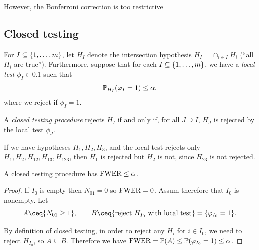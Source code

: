 However, the Bonferroni correction is too restrictive

\subsection{Closed testing}
For $I \subseteq \qty{1, \dotsc, m}$, let $H_I$ denote the intersection hypothesis $H_I = \cap_{i \in I} H_i$ (``all $H_i$ are true'').  Furthermore, suppose that for each $I \subseteq \qty{1, \dotsc, m}$, we have a \emph{local test} $\phi_I \in \qty{0, 1}$ such that
\[
\mathbb P_{H_I}(\varphi_I = 1) \leq \alpha,
\]
where we reject if $\phi_I= 1$.

\begin{definition}
	A \emph{closed testing procedure} rejects $H_I$ if and only if, for all $J \supseteq I$, $H_J$ is rejected by the local test $\phi_J$. 
\end{definition} 

\begin{example}
	If we have hypotheses $H_1, H_2, H_3$, and the local test rejects only $H_1, H_2, H_{12}, H_{13}, H_{123}$, then $H_1$ is rejected but $H_2$ is not, since $H_{23}$ is not rejected. 
\end{example}

\begin{theorem}
	A closed testing procedure has $\operatorname{FWER} \leq\alpha$. 
\end{theorem}

\begin{proof}
	If $I_0$ is empty then $N_{01} =0$ so $\operatorname{FWER} = 0$. Assum therefore that $I_0$ is nonempty. Let
	\[
	A \ceq \qty{N_{01} \geq 1}, \qquad B \ceq \qty{\text{reject $H_{I_0}$ with local test}} = \qty{\phi_{I_0} = 1}.
	\]
	
	By definition of closed testing, in order to reject any $H_i$ for $i \in I_0$, we need to reject $H_{I_0}$, so $A \subseteq B$. Therefore we have
	$\operatorname{FWER} = \mathbb P(A) \leq \mathbb P(\varphi_{I_0}= 1) \leq \alpha$. 
\end{proof}

